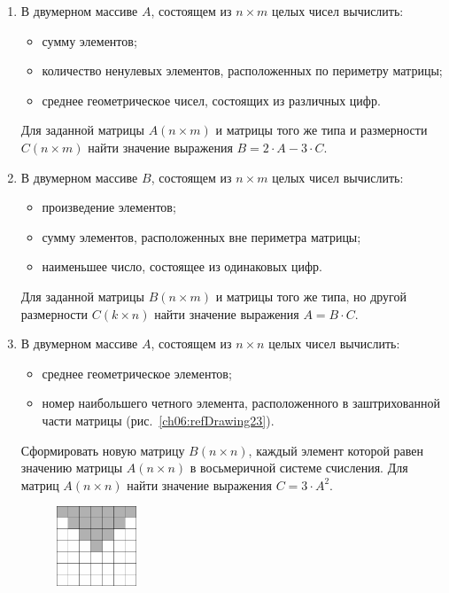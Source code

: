 \begin{enumerate}
\item В двумерном массиве $A$, состоящем из $n\times m$ целых чисел вычислить: 

\begin{itemize}
\item сумму элементов;
\item количество ненулевых элементов, расположенных по периметру матрицы;
\item среднее геометрическое чисел, состоящих из различных цифр.
\end{itemize}

Для заданной матрицы $A(n\times m)$ и матрицы того же типа и размерности
$C(n\times m)$ найти значение выражения  $B=2\cdot A-3\cdot C$.
\item В двумерном массиве $B$, состоящем из $n\times m$ целых чисел вычислить:

\begin{itemize}
\item произведение элементов;
\item сумму элементов, расположенных вне периметра матрицы;
\item наименьшее число, состоящее из одинаковых цифр.
\end{itemize}

Для заданной матрицы $B(n\times m)$ и матрицы того же типа, но другой размерности
$C(k\times n)$ найти значение выражения  $A=B\cdot C$.
\item В двумерном массиве $A$, состоящем из $n\times n$ целых чисел вычислить:

\begin{itemize}
\item среднее геометрическое элементов;
\item номер наибольшего четного элемента, расположенного в заштрихованной части матрицы (рис.~\ref{ch06:refDrawing23}).
\end{itemize}

Сформировать новую матрицу $B(n\times n)$, каждый элемент которой равен значению матрицы
$A(n\times n)$ в восьмеричной системе счисления. Для матриц $A(n\times n)$ найти
значение выражения  $C=3\cdot A^2$.

\begin{figure}%
\begin{floatrow}[4]
\ffigbox[\FBwidth]
{%
\captionsetup{labelfont=footnotesize}\caption{}%
\label{ch06:refDrawing23}}
{\includegraphics[width=0.225\textwidth,keepaspectratio]{img/ris_6_24}}%


\end{floatrow}
\end{figure}
\end{enumerate}
